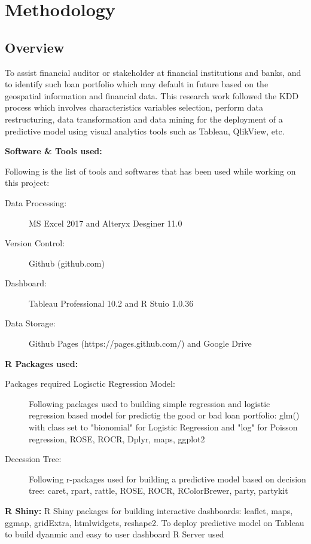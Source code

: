 %
%
%
%

\chapter{Methodology}\label{C.Methodology}

\section{Overview}\label{S.Ch4.opening}
To assist financial auditor or stakeholder at financial institutions and banks, and to identify such loan portfolio which may default in future based on the geospatial information and financial data. This research work followed the KDD process which involves characteristics variables selection, perform data restructuring, data transformation and data mining for the deployment of a predictive model using visual analytics tools such as Tableau, QlikView, etc.

\textbf{Software \& Tools used:}

Following is the list of tools and softwares that has been used while working on this project:
\begin{description}
  \item[Data Processing:] MS Excel 2017 and Alteryx Desginer 11.0
  \item[Version Control:] Github (github.com)
  \item[Dashboard:] Tableau Professional 10.2 and R Stuio 1.0.36
  \item[Data Storage:] Github Pages (https://pages.github.com/) and Google Drive
\end{description}
\textbf{R Packages used:}
\begin{description}
  \item[Packages required Logisctic Regression Model:] Following packages used to building simple regression and logistic regression based model for predictig the good or bad loan portfolio: glm() with class set to "bionomial" for Logistic Regression and "log" for Poisson regression, ROSE, ROCR, Dplyr, maps, ggplot2
  \item[Decession Tree:] Following r-packages used for building a predictive model based on decision tree: caret, rpart, rattle, ROSE, ROCR, RColorBrewer, party, partykit
\end{description}
\textbf{R Shiny:} R Shiny packages for building interactive dashboards: leaflet, maps, ggmap, gridExtra, htmlwidgets, reshape2. To deploy predictive model on Tableau to build dyanmic and easy to user dashboard R Server used



